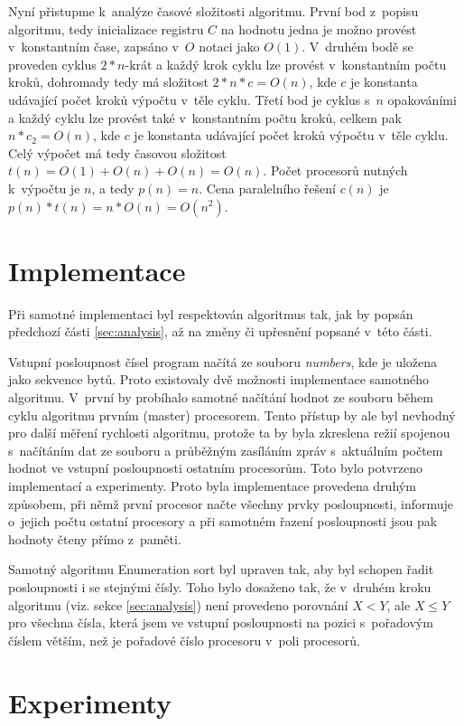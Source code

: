 \documentclass[a4paper, 12pt]{article}
\begin{document}
Nyní přistupme k~analýze časové složitosti algoritmu.
První bod z~popisu algoritmu, tedy inicializace registru $C$ na hodnotu jedna je možno provést v~konstantním čase,
zapsáno v~$O$ notaci jako $O(1)$.
V~druhém bodě se proveden cyklus $2*n$-krát a každý krok cyklu lze provést v~konstantním počtu kroků, dohromady tedy
má složitost $2*n*c=O(n)$, kde $c$ je konstanta udávající počet kroků výpočtu v~těle cyklu.
Třetí bod je cyklus s~$n$ opakováními a každý cyklu lze provést také v~konstantním počtu kroků, celkem pak $n*c_2=O(n)$,
kde $c$ je konstanta udávající počet kroků výpočtu v~těle cyklu.
Celý výpočet má tedy časovou složitost $t(n)=O(1)+O(n)+O(n)=O(n)$.
Počet procesorů nutných k~výpočtu je $n$, a tedy $p(n)=n$.
Cena paralelního řešení $c(n)$ je $p(n)*t(n)=n*O(n)=O(n^2)$.


\section{Implementace}
\label{sec:impl}
Při samotné implementaci byl respektován algoritmus tak, jak by popsán předchozí části \ref{sec:analysis}, až na změny či upřesnění popsané v~této části.

Vstupní posloupnost čísel program načítá ze souboru \emph{numbers}, kde je uložena jako sekvence bytů.
Proto existovaly dvě možnosti implementace samotného algoritmu.
V~první by probíhalo samotné načítání hodnot ze souboru během cyklu algoritmu prvním (master) procesorem.
Tento přístup by ale byl nevhodný pro další měření rychlosti algoritmu, protože ta by byla
zkreslena režií spojenou s~načítáním dat ze souboru a průběžným zasíláním zpráv s~aktuálním počtem hodnot
ve vstupní posloupnosti ostatním procesorům.
Toto bylo potvrzeno implementací a experimenty.
Proto byla implementace provedena druhým způsobem, při němž první procesor načte všechny prvky posloupnosti,
informuje o~jejich počtu ostatní procesory a při samotném řazení posloupnosti jsou pak hodnoty čteny přímo z~paměti.

Samotný algoritmu Enumeration sort byl upraven tak, aby byl schopen řadit posloupnosti i se stejnými čísly.
Toho bylo dosaženo tak, že v~druhém kroku algoritmu (viz. sekce \ref{sec:analysis}) není provedeno
porovnání $X<Y$, ale $X \leq Y$ pro všechna čísla, která jsem ve vstupní posloupnosti na pozici s~pořadovým
číslem větším, než je pořadové číslo procesoru v~poli procesorů.

\section{Experimenty}
\label{sec:exprmts}
\end{document}
